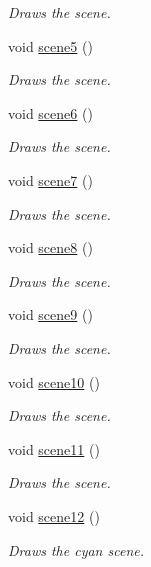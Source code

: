 \begin{DoxyCompactItemize}
\begin{DoxyCompactList}\small\item\em Draws the scene. \end{DoxyCompactList}\item 
void \hyperlink{classcutscene1_ace82590104cccbecfd5ec0b4bacaca91}{scene5} ()
\begin{DoxyCompactList}\small\item\em Draws the scene. \end{DoxyCompactList}\item 
void \hyperlink{classcutscene1_a2f30889d2d2d5126b99823bb81b167b3}{scene6} ()
\begin{DoxyCompactList}\small\item\em Draws the scene. \end{DoxyCompactList}\item 
void \hyperlink{classcutscene1_a5f5798e0f4ab664320f0f35aaa22b2a3}{scene7} ()
\begin{DoxyCompactList}\small\item\em Draws the scene. \end{DoxyCompactList}\item 
void \hyperlink{classcutscene1_a9f335e0ddd6112269bfd88a3b0cecdb5}{scene8} ()
\begin{DoxyCompactList}\small\item\em Draws the scene. \end{DoxyCompactList}\item 
void \hyperlink{classcutscene1_a5876edaf8fe041660e98c7aa8ca9c18b}{scene9} ()
\begin{DoxyCompactList}\small\item\em Draws the scene. \end{DoxyCompactList}\item 
void \hyperlink{classcutscene1_ad8352de19bf15b9b1104b76d4c278be8}{scene10} ()
\begin{DoxyCompactList}\small\item\em Draws the scene. \end{DoxyCompactList}\item 
void \hyperlink{classcutscene1_ac86b4ca661908ea43d5b672f3fc359c3}{scene11} ()
\begin{DoxyCompactList}\small\item\em Draws the scene. \end{DoxyCompactList}\item 
void \hyperlink{classcutscene1_a6c57956c7ec2eb301b2f093a1b3c9925}{scene12} ()
\begin{DoxyCompactList}\small\item\em Draws the cyan scene. \end{DoxyCompactList}\item 

\end{DoxyCompactItemize}
